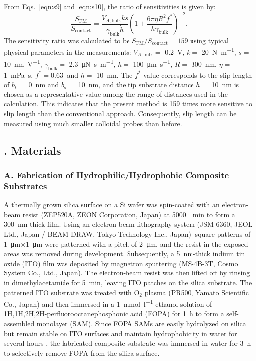 \documentclass[journal=jacsat,manuscript=article]{achemso}
\newcounter{supppart}
\renewcommand{\thesupppart}{\Roman{supppart}}
\newcommand{\subsectionpart}[2]{%
  \refstepcounter{supppart}%
  \subsection{\thesupppart. #2}%
  \label{supppart:#1}%
}
\begin{document}
From Eqs.~\ref{eqn:s9} and \ref{eqn:s10}, the ratio of sensitivities is given by:
\begin{equation}
  \frac{S_{\text{FM}}}{S_{\text{contact}}} = \frac{V_{A,\text{bulk}} k s}{\gamma_{\text{bulk}} \dot{h}}\left(1 + \frac{6\pi\eta R^2 f^{*}}{h\gamma_{\text{bulk}}}\right)^{-2}.
  \tag{S11}
  \label{eqn:s11}
\end{equation}
The sensitivity ratio was calculated to be \(S_{\text{FM}}/S_{\text{contact}} = 159\) using typical physical parameters in the measurements: \(V_{A,\text{bulk}} =\) \SI{0.2}{\volt}, \(k =\) \SI{20}{\newton\per\metre}, \(s =\) \SI{10}{\nano\metre\per\volt}, \(\gamma_{\text{bulk}} =\) \SI{2.3}{\micro\newton\second\per\metre}, \(\dot{h} =\) \SI{100}{\micro\metre\per\second}, \(R =\) \SI{300}{\nano\metre}, \(\eta =\) \SI{1}{\milli\pascal\second}, \(f^{*} = 0.63\), and \(h =\) \SI{10}{\nano\metre}. The \(f^{*}\) value corresponds to the slip length of \(b_t =\) \SI{0}{\nano\metre} and \(b_s =\) \SI{10}{\nano\metre}, and the tip substrate distance \(h =\) \SI{10}{\nano\metre} is chosen as a representative value among the range of distances used in the calculation. This indicates that the present method is 159 times more sensitive to slip length than the conventional approach. Consequently, slip length can be measured using much smaller colloidal probes than before.

\subsectionpart{materials}{Materials}

\subsubsection{A. Fabrication of Hydrophilic/Hydrophobic Composite Substrates}

A thermally grown silica surface on a Si wafer was spin-coated with an electron-beam resist (ZEP520A, ZEON Corporation, Japan) at \SI{5000}{\per\minute} to form a \SI{300}{\nano\metre}-thick film. Using an electron-beam lithography system (JSM-6360, JEOL Ltd., Japan / BEAM DRAW, Tokyo Technology Inc., Japan), square patterns of \SI{1}{\micro\metre}\(\times\)\SI{1}{\micro\metre} were patterned with a pitch of \SI{2}{\micro\metre}, and the resist in the exposed areas was removed during development. Subsequently, a \SI{5}{\nano\metre}-thick indium tin oxide (ITO) film was deposited by magnetron sputtering (MS-4B-3T, Cosmo System Co., Ltd., Japan). The electron-beam resist was then lifted off by rinsing in dimethylacetamide for \SI{5}{\minute}, leaving ITO patches on the silica substrate. The patterned ITO substrate was treated with \(\mathrm{O}_2\) plasma (PR500, Yamato Scientific Co., Japan) and then immersed in a \SI{1}{\milli\mole\per\litre} ethanol solution of 1H,1H,2H,2H-perfluorooctanephosphonic acid (FOPA) for \SI{1}{\hour} to form a self-assembled monolayer (SAM). Since FOPA SAMs are easily hydrolyzed on silica but remain stable on ITO surfaces and maintain hydrophobicity in water for several hours \cite{Thissen2012-xt, Jo2011-nw}, the fabricated composite substrate was immersed in water for \SI{3}{\hour} to selectively remove FOPA from the silica surface.
\end{document}
